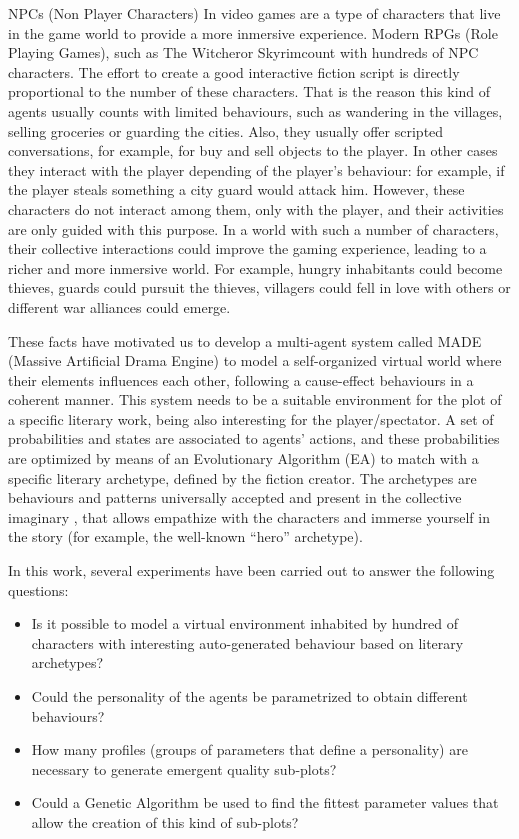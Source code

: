 \documentclass[runningheads]{llncs}
\begin{document}
NPCs (Non Player Characters) In video games are a type of characters that live in the game world to provide a more inmersive experience. Modern RPGs (Role Playing Games), such as The Witcher\texttrademark or Skyrim\texttrademark count with hundreds of NPC characters. The effort to create a good interactive fiction script is directly proportional to the number of these characters. That is the reason this kind of agents usually counts with limited behaviours, such as wandering in the villages, selling groceries or guarding the cities. Also, they usually offer scripted conversations, for example, for buy and sell objects to the player. In other cases they interact with the player depending of the player's behaviour: for example, if the player steals something a city guard would attack him.  However, these characters do not interact among them, only with the player, and their activities are only guided with this purpose. In a world with such a number of characters, their collective interactions could improve the gaming experience, leading to a richer and more inmersive world. For example, hungry inhabitants could become thieves, guards could pursuit the thieves, villagers could fell in love with others or different war alliances could emerge.

These facts have motivated us to develop a multi-agent system called MADE (Massive Artificial Drama Engine) to model a self-organized virtual world where their elements influences each other, following a cause-effect behaviours in a coherent manner. This system needs to be a suitable environment for the plot of a specific literary work, being also interesting for the player/spectator. A set of probabilities and states are associated to agents' actions, and these probabilities are optimized by means of an Evolutionary Algorithm (EA) to match with a specific literary archetype, defined by the fiction creator. The archetypes are behaviours and patterns universally accepted and present in the collective imaginary \cite{ArchetypesGarry05}, that allows empathize with the characters and immerse yourself in the story (for example, the well-known ``hero'' archetype).

In this work, several experiments have been carried out to answer the following questions: 


\begin{itemize}
 \item Is it possible to model a virtual environment inhabited by hundred of characters with interesting auto-generated behaviour based on literary archetypes?
 \item Could the personality of the agents be parametrized to obtain different behaviours? 
 \item How many profiles (groups of parameters that define a personality) are necessary to generate emergent quality sub-plots?
 \item Could a Genetic Algorithm be used to find the fittest parameter values that allow the creation of this kind of sub-plots?
\end{itemize}
\end{document}
